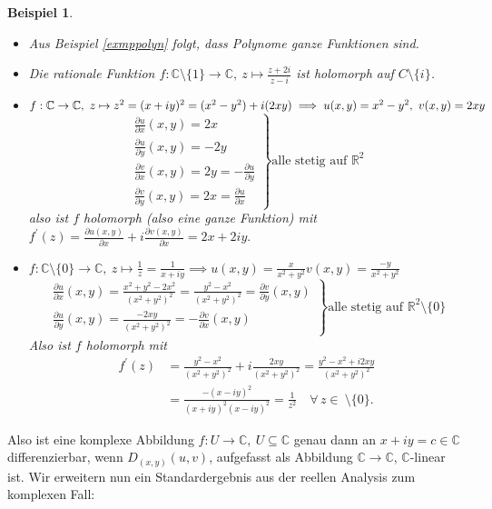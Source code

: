 \documentclass[a4paper,12pt]{article}
\theoremstyle{newthm}
\theoremstyle{newdef}
\theoremstyle{newrem}
\newtheorem{exmp}[thm]{Beispiel}
\newcommand{\R}{\mathbb{R}}
\newcommand{\C}{\mathbb{C}}
\newcommand{\del}{\partial}
\begin{document}
		\begin{exmp}
			\begin{itemize}
				\item Aus Beispiel \ref{exmppolyn} folgt, dass Polynome ganze Funktionen sind.
				
				\item Die rationale Funktion $ f: \C\setminus \{1\} \to \C,\ z \mapsto \frac{z+2i}{z-i} $ ist holomorph auf $ C \setminus \{i\} $.
				
				\item $ f: \C \to \C,\ z \mapsto z^2 = (x+iy)^2 = (x^2-y^2)+i(2xy) \\
				\implies u(x,y) = x^2-y^2,\ v(x,y) = 2xy $
				\[
				\left.\begin{array}{ll}
					\frac{\del u}{\del x}(x,y) = 2x\\
					\frac{\del u}{\del y}(x,y) = -2y\\
					\frac{\del v}{\del x}(x,y) = 2y = -\frac{\del u}{\del y}\\
					\frac{\del v}{\del y}(x,y) = 2x = \frac{\del u}{\del x}
				\end{array} \right\} \text{alle stetig auf }\R^2
				\]
				also ist $f$ holomorph (also eine ganze Funktion) mit $ f^\prime(z) = \frac{\del u(x,y)}{\del x} + i\frac{\del v(x,y)}{\del x} = 2x + 2iy. $
				
				\item $ f: \C\setminus\{0\} \to \C,\ z \mapsto \frac{1}{z} = \frac{1}{x+iy} \implies u(x,y) = \frac{x}{x^2 + y^2} v(x,y) = \frac{-y}{x^2 + y^2} $
				\[
				\left.\begin{array}{ll}
				\frac{\del u}{\del x}(x,y) = \frac{x^2+y^2-2x^2}{(x^2+y^2)^2} = \frac{y^2-x^2}{(x^2+y^2)^2} = \frac{\del v}{\del y}(x,y)\\
				\frac{\del u}{\del y}(x,y) = \frac{-2xy}{(x^2+y^2)^2} = -\frac{\del v}{\del x}(x,y)
				\end{array} \right\} \text{alle stetig auf }\R^2\setminus\{0\}
				\]
				Also ist $f$ holomorph mit 
				\begin{align*}
					f^\prime(z) &= \frac{y^2-x^2}{(x^2+y^2)^2} + i\frac{2xy}{(x^2+y^2)^2} = \frac{y^2-x^2 + i2xy}{(x^2+y^2)^2}\\
					&= \frac{-(x-iy)^2}{(x+iy)^2(x-iy)^2} = \frac{1}{z^2}\quad \forall\, z \in \ \setminus\{0\}. 
				\end{align*}
			\end{itemize}
		\end{exmp}
		
		Also ist eine komplexe Abbildung $ f: U \to \C,\ U \subseteq \C $ genau dann an $ x+iy = c \in \C $ differenzierbar, wenn $ D_{(x,y)}(u,v) $, aufgefasst als Abbildung $ \C \to \C $, $\C$-linear ist. Wir erweitern nun ein Standardergebnis aus der reellen Analysis zum komplexen Fall:
		
\end{document}
